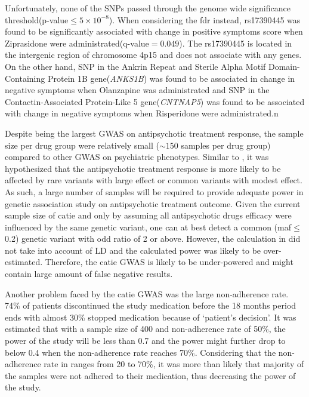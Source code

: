 	Unfortunately, none of the \glspl{SNP} passed through the genome wide significance threshold(p-value$\le5\times10^{-8}$).
	When considering the \gls{fdr} instead, rs17390445 was found to be significantly associated with change in positive symptoms score when Ziprasidone were administrated(q-value$=0.049$).
	The rs17390445 is located in the intergenic region of chromosome 4p15 and does not associate with any genes. 
	On the other hand, \gls{SNP} in the Ankrin Repeat and Sterile Alpha Motif Domain-Containing Protein 1B gene(\textit{ANKS1B}) was found to be associated in change in negative symptoms when Olanzapine was administrated and \gls{SNP} in the Contactin-Associated Protein-Like 5 gene(\textit{CNTNAP5}) was found to be associated with change in negative symptoms when Risperidone were administrated.n  

	Despite being the largest \gls{GWAS} on antipsychotic treatment response, the sample size per drug group were relatively small ($\sim150$ samples per drug group) compared to other \gls{GWAS} on psychiatric phenotypes.
	Similar to , it was hypothesized that the antipsychotic treatment response is more likely to be affected by rare variants with large effect or common variants with modest effect\citep{Jorgensen2008}. 
	As such, a large number of samples will be required to provide adequate power in genetic association study on antipsychotic treatment outcome.
	Given the current sample size of \gls{catie} and only by assuming all antipsychotic drugs efficacy were influenced by the same genetic variant, one can at best detect a common (\gls{maf}$\le$ 0.2) genetic variant with odd ratio of 2 or above\citep{Jorgensen2008}.	
	However, the calculation in \citet{Jorgensen2008} did not take into account of \gls{LD} and the calculated power was likely to be over-estimated.
	Therefore, the \gls{catie} \gls{GWAS} is likely to be under-powered and might contain large amount of false negative results.
	
	Another problem faced by the \gls{catie} \gls{GWAS} was the large non-adherence rate. 
	74\% of patients discontinued the study medication before the 18 months period ends\citep{Lieberman2005} with almost 30\% stopped medication because of `patient's decision'.
	It was estimated that with a sample size of 400 and non-adherence rate of 50\%, the power of the study will be less than 0.7 and the power might further drop to below 0.4 when the non-adherence rate reaches 70\%\citep{Malhotra2012}.
	Considering that the non-adherence rate in  ranges from 20 to 70\%\citep{Malhotra2012}, it was more than likely that majority of the samples were not adhered to their medication, thus decreasing the power of the study.
	
